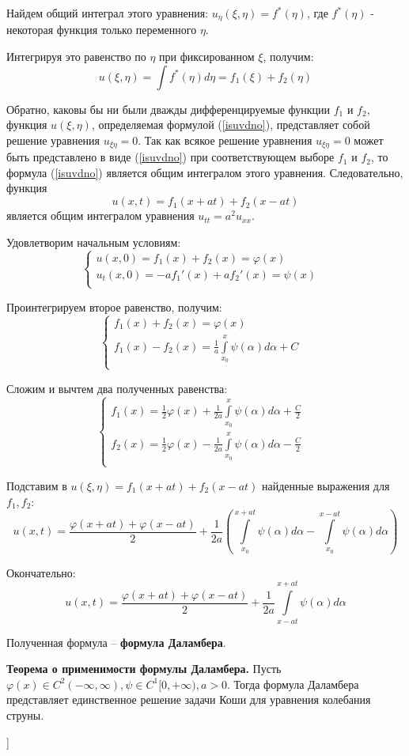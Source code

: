 Найдем общий интеграл этого уравнения: $u_{\eta}(\xi, \eta)=f^*(\eta)$, где $f^*(\eta)$ - некоторая функция только переменного $\eta$.

Интегрируя это равенство по $\eta$ при фиксированном $\xi$, получим:
\begin{equation}
    u(\xi, \eta)=\int f^*(\eta)d\eta = f_1(\xi) + f_2(\eta)
    \label{isuvdno}
\end{equation}

Обратно, каковы бы ни были дважды дифференцируемые функции $f_1$ и $f_2$, функция $u(\xi,\eta)$, определяемая формулой (\ref{isuvdno}), представляет собой решение уравнения $u_{\xi\eta}=0$. Так как всякое решение уравнения $u_{\xi\eta}=0$ может быть представлено в виде (\ref{isuvdno}) при соответствующем выборе $f_1$ и $f_2$, то формула (\ref{isuvdno}) является общим интегралом этого уравнения. Следовательно, функция $$u(x, t) = f_1(x+at) + f_2(x-at)$$ является общим интегралом уравнения $u_{tt}=a^2u_{xx}$.

Удовлетворим начальным условиям:
$$\begin{cases}
u(x,0)=f_1(x)+f_2(x)=\varphi(x)&\\
u_t(x,0)=-af_1'(x)+af_2'(x)=\psi(x)&\\
\end{cases}
$$

Проинтегрируем второе равенство, получим:
$$\begin{cases}
f_1(x)+f_2(x)=\varphi(x)&\\
f_1(x)-f_2(x)=\frac{1}{a}\int\limits_{x_0}^{x}\psi(\alpha)d\alpha + C&\\
\end{cases}
$$

Сложим и вычтем два полученных равенства:
$$\begin{cases}
f_1(x)=\frac{1}{2}\varphi(x)+\frac{1}{2a}\int\limits_{x_0}^{x}\psi(\alpha)d\alpha + \frac{C}{2}&\\
f_2(x)=\frac{1}{2}\varphi(x)-\frac{1}{2a}\int\limits_{x_0}^{x}\psi(\alpha)d\alpha - \frac{C}{2}&\\
\end{cases}
$$

Подставим в $u(\xi, \eta) = f_1(x+at) + f_2(x-at)$ найденные выражения для $f_1, f_2$:
$$u(x,t)=\frac{\varphi(x+at)+\varphi(x-at)}{2} + \frac{1}{2a}\left(\int\limits_{x_0}^{x+at}\psi(\alpha)d\alpha - \int\limits_{x_0}^{x-at}\psi(\alpha)d\alpha\right)$$

Окончательно:
$$u(x,t)= \frac{\varphi(x+at)+\varphi(x-at)}{2} + \frac{1}{2a}\int\limits_{x-at}^{x+at}\psi(\alpha)d\alpha$$

Полученная формула -- \textbf{формула Даламбера}.

\textbf{Теорема о применимости формулы Даламбера.} Пусть $\varphi(x) \in C^2(-\infty, \infty), \psi \in C^1[0,+\infty), a > 0$. Тогда формула Даламбера представляет единственное решение задачи Коши для уравнения колебания струны.

\bigbreak
[\cite[page 50-52]{urmati_tikhonov}]
